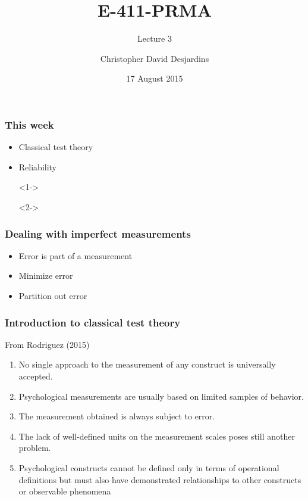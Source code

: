 \documentclass[dvipsnames]{beamer}\usepackage[]{graphicx}\usepackage[]{color}
\title{E-411-PRMA}
\subtitle{Lecture 3}
\author{Christopher David Desjardins}
\date{17 August 2015}
\begin{document}
\frame{\titlepage}

\section[Outline]{}
\frame{\tableofcontents}

\begin{frame}
\frametitle{This week}
\begin{itemize}
  \item Classical test theory
  \item Reliability
\end{itemize}
\end{frame}

{
\begin{frame}
\centering
\begin{itemize}
\item[]<1-> \Huge \textcolor{white}{Is there a perfect or exact measurement?}
                           
\vspace{1cm}
\item[]<2->\Huge \textcolor{white}{Must we always deal with error?}
\end{itemize}
\end{frame}
}

\begin{frame}
\frametitle{Dealing with imperfect measurements}
\begin{itemize}
  \item Error is part of a measurement
  \item Minimize error 
  \item Partition out error 
\end{itemize}
\end{frame}

\begin{frame}
\frametitle{Introduction to classical test theory}
From Rodriguez (2015)\footnotemark 
\begin{enumerate}
  \item<1->No single approach to the measurement of any construct is universally accepted.
\item<2->Psychological measurements are usually based on limited samples of behavior.
\item<3->The measurement obtained is always subject to error.
\item<4->The lack of well-defined units on the measurement scales poses still another problem.
\item<5->Psychological constructs cannot be defined only in terms of operational definitions but must also have demonstrated relationships to other constructs or observable phenomena
\end{enumerate}
\end{frame}
\end{document}
